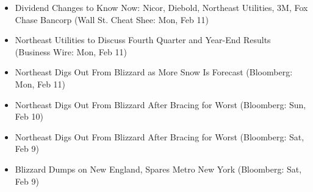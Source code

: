 \documentclass[11pt,asymmetric]{article}
\begin{document}
\begin{itemize}
\item Dividend Changes to Know Now: Nicor, Diebold, Northeast Utilities, 3M, Fox Chase Bancorp (Wall St. Cheat Shee: Mon, Feb 11)
\item Northeast Utilities to Discuss Fourth Quarter and Year-End Results (Business Wire: Mon, Feb 11)
\item Northeast Digs Out From Blizzard as More Snow Is Forecast (Bloomberg: Mon, Feb 11)
\item Northeast Digs Out From Blizzard After Bracing for Worst (Bloomberg: Sun, Feb 10)
\item Northeast Digs Out From Blizzard After Bracing for Worst (Bloomberg: Sat, Feb 9)
\item Blizzard Dumps on New England, Spares Metro New York (Bloomberg: Sat, Feb 9)
\end{itemize}
\end{document}

